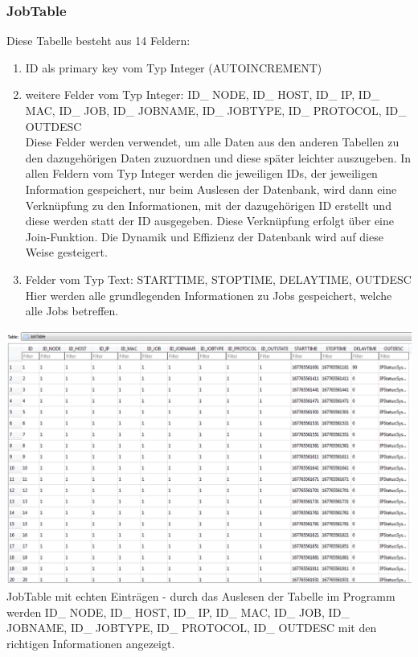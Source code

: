 \documentclass[12pt,a4paper]{report}
\begin{document}
\begin{onehalfspace}
\subsubsection{JobTable}
Diese Tabelle besteht aus 14 Feldern:
\begin{enumerate}
\item ID als primary key vom Typ Integer (AUTOINCREMENT)
\item weitere Felder vom Typ Integer: ID\_ NODE, ID\_ HOST, ID\_ IP, ID\_ MAC, ID\_ JOB, ID\_ JOBNAME, ID\_ JOBTYPE, ID\_ PROTOCOL, ID\_ OUTDESC\\
Diese Felder werden verwendet, um alle Daten aus den anderen Tabellen zu den dazugehörigen Daten zuzuordnen und diese später leichter auszugeben. In allen Feldern vom Typ Integer werden die jeweiligen IDs, der jeweiligen Information gespeichert, nur beim Auslesen der Datenbank, wird dann eine Verknüpfung zu den Informationen, mit der dazugehörigen ID erstellt und diese werden statt der ID ausgegeben.  Diese Verknüpfung erfolgt über eine Join-Funktion. Die Dynamik und Effizienz der Datenbank wird auf diese Weise gesteigert.
\item Felder vom Typ Text: STARTTIME, STOPTIME, DELAYTIME, OUTDESC\\
Hier werden alle grundlegenden Informationen zu Jobs gespeichert, welche alle Jobs betreffen.
\end{enumerate}
\begin{center}
\includegraphics[scale=0.5]{img/db-tb-job.png}\\
JobTable mit echten Einträgen - durch das Auslesen der Tabelle im Programm werden ID\_ NODE, ID\_ HOST, ID\_ IP, ID\_ MAC, ID\_ JOB, ID\_ JOBNAME, ID\_ JOBTYPE, ID\_ PROTOCOL, ID\_ OUTDESC mit den richtigen Informationen angezeigt.
\end{center}

\end{onehalfspace}
\end{document}
